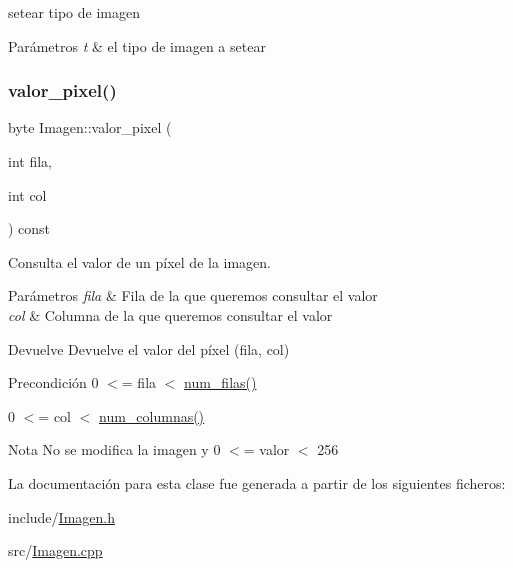 setear tipo de imagen 


\begin{DoxyParams}{Parámetros}
{\em t} & el tipo de imagen a setear \\
\hline
\end{DoxyParams}
\mbox{\label{classImagen_a7d9378695a7fd2dce8092f180e716229}} 
\subsubsection{\texorpdfstring{valor\+\_\+pixel()}{valor\_pixel()}}
{\footnotesize\ttfamily byte Imagen\+::valor\+\_\+pixel (\begin{DoxyParamCaption}\item[{int}]{fila,  }\item[{int}]{col }\end{DoxyParamCaption}) const}



Consulta el valor de un píxel de la imagen. 


\begin{DoxyParams}{Parámetros}
{\em fila} & Fila de la que queremos consultar el valor \\
\hline
{\em col} & Columna de la que queremos consultar el valor \\
\hline
\end{DoxyParams}
\begin{DoxyReturn}{Devuelve}
Devuelve el valor del píxel (fila, col) 
\end{DoxyReturn}
\begin{DoxyPrecond}{Precondición}
0 $<$= fila $<$ \hyperlink{classImagen_a4cb4faa04f5e2913965e43a6a65acfd1}{num\+\_\+filas()} 

0 $<$= col $<$ \hyperlink{classImagen_ac28d55c18064aea2a65e6fcf51d86191}{num\+\_\+columnas()} 
\end{DoxyPrecond}
\begin{DoxyNote}{Nota}
No se modifica la imagen y 0 $<$= valor $<$ 256 
\end{DoxyNote}


La documentación para esta clase fue generada a partir de los siguientes ficheros\+:\begin{DoxyCompactItemize}
\item 
include/\hyperlink{Imagen_8h}{Imagen.\+h}\item 
src/\hyperlink{Imagen_8cpp}{Imagen.\+cpp}\end{DoxyCompactItemize}

